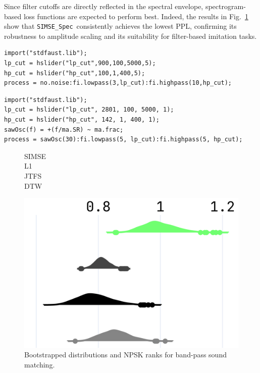 \documentclass[runningheads]{llncs}
\newcommand{\SIMSESpec}{\texttt{SIMSE\_Spec}\xspace}
\newcommand{\BPNoise}{\textbf{BP-Noise}\xspace}
\newcommand{\BPSaw}{\textbf{BP-Saw}\xspace}
\begin{document}
Since filter cutoffs are directly reflected in the spectral envelope, spectrogram-based loss functions are expected to perform best.  
Indeed, the results in Fig.~\ref{fig:npsk_BP} show that \SIMSESpec\ consistently achieves the lowest PPL, confirming its robustness to amplitude scaling and its suitability for filter-based imitation tasks.

\begin{lstlisting}[caption={\BPNoise}, label={lst:program0}, language=Faust,
float, floatplacement=!H, xleftmargin=1em, xrightmargin=0.5em, firstnumber=0, aboveskip=0em, belowskip=-1em]
import("stdfaust.lib");
lp_cut = hslider("lp_cut",900,100,5000,5);
hp_cut = hslider("hp_cut",100,1,400,5);
process = no.noise:fi.lowpass(3,lp_cut):fi.highpass(10,hp_cut);
\end{lstlisting}

\begin{lstlisting}[caption={\BPSaw}, label={lst:program0_saw}, language=Faust,
float, floatplacement=!H, xleftmargin=1em, xrightmargin=0.5em, firstnumber=0, aboveskip=0em, belowskip=-1em]
import("stdfaust.lib");
lp_cut = hslider("lp_cut", 2801, 100, 5000, 1);
hp_cut = hslider("hp_cut", 142, 1, 400, 1);
sawOsc(f) = +(f/ma.SR) ~ ma.frac;
process = sawOsc(30):fi.lowpass(5, lp_cut):fi.highpass(5, hp_cut);
\end{lstlisting}

\begin{figure}[htbp]
  \centering
  \scriptsize
  \begin{minipage}{\columnwidth}
    \begin{minipage}{0.10\columnwidth}
      \raggedleft
      \vspace{0.5cm}
      SIMSE\\[0.6cm]
      L1\\[0.65cm]
      JTFS\\[0.65cm]
      DTW
    \end{minipage}%
    \begin{minipage}{0.88\columnwidth}
      \centering
      \includegraphics[width=\linewidth]{images/npsk_ood_P_Loss_3.png}
    \end{minipage}
  \end{minipage}
  \caption{Bootstrapped distributions and NPSK ranks for band-pass sound matching.}
  \label{fig:npsk_BP}
\end{figure}
\end{document}
